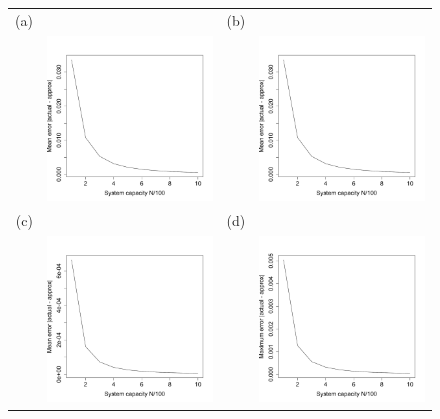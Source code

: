 \documentclass[a4paper]{article}
\begin{document}
         \begin{figure}[th]
\centering
   \begin{tabular}{rrrr}
   (a)&&(b)&\\
  &\includegraphics[width=2.5in]{meanerrorovermatrix.pdf} && \includegraphics[width=2.5in]{meanerrorovermatrix.pdf} \\
  (c)&&(d)&\\
  &\includegraphics[width=2.5in]{meanerrortotovermatrix.pdf} && \includegraphics[width=2.5in]{maxerrortotovermatrix.pdf} \end{tabular}

\end{figure}
\end{document}
